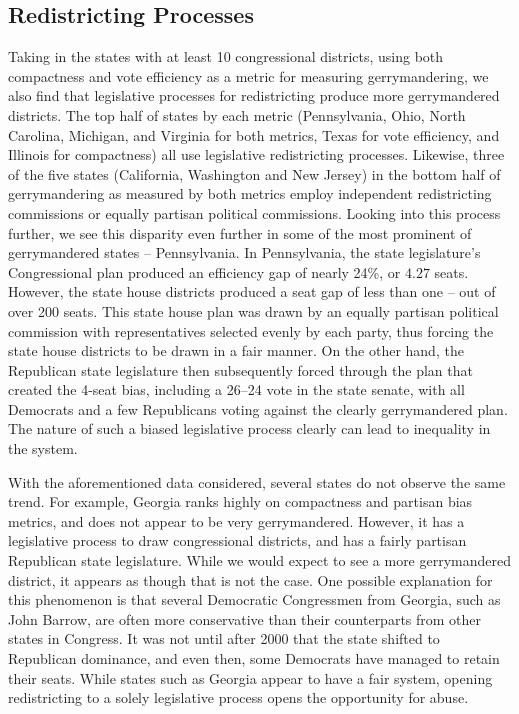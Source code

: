 \documentclass[12pt]{article}
\begin{document}
 \subsection{Redistricting Processes}
Taking in the states with at least 10 congressional districts, using both compactness and vote efficiency as a metric for measuring gerrymandering, we also find that legislative processes for redistricting produce more gerrymandered districts. The top half of states by each metric (Pennsylvania, Ohio, North Carolina, Michigan, and Virginia for both metrics, Texas for vote efficiency, and Illinois for compactness) all use legislative redistricting processes.  Likewise, three of the five states (California, Washington and New Jersey) in the bottom half of gerrymandering as measured by both metrics employ independent redistricting commissions or equally partisan political commissions.
Looking into this process further, we see this disparity even further in some of the most prominent of gerrymandered states -- Pennsylvania.  In Pennsylvania, the state legislature's Congressional plan produced an efficiency gap of nearly 24\%, or $4.27$ seats.  However, the state house districts produced a seat gap of less than one -- out of over 200 seats.  This state house plan was drawn by an equally partisan political commission with representatives selected evenly by each party, thus forcing the state house districts to be drawn in a fair manner.  On the other hand, the Republican state legislature then subsequently forced through the plan that created the 4-seat bias, including a 26--24 vote in the state senate, with all Democrats and a few Republicans voting against the clearly gerrymandered plan.  The nature of such a biased legislative process clearly can lead to inequality in the system.

With the aforementioned data considered, several states do not observe the same trend.  For example, Georgia ranks highly on compactness and partisan bias metrics, and does not appear to be very gerrymandered.  However, it has a legislative process to draw congressional districts, and has a fairly partisan Republican state legislature.  While we would expect to see a more gerrymandered district, it appears as though that is not the case.  One possible explanation for this phenomenon is that several Democratic Congressmen from Georgia, such as John Barrow, are often more conservative than their counterparts from other states in Congress.  It was not until after 2000 that the state shifted to Republican dominance, and even then, some Democrats have managed to retain their seats.  While states such as Georgia appear to have a fair system, opening redistricting to a solely legislative process opens the opportunity for abuse.
\end{document}
